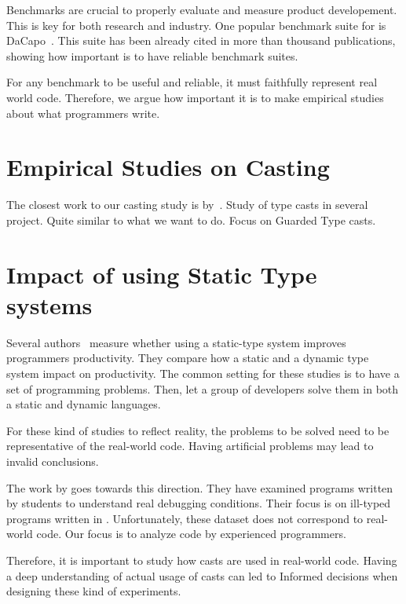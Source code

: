 Benchmarks are crucial to properly evaluate and measure product developement.
This is key for both research and industry.
One popular benchmark suite for \java{} is DaCapo~\cite{blackburn_dacapo_2006}.
This suite has been already cited in more than thousand publications, showing how important is to have reliable benchmark suites.

For any benchmark to be useful and reliable, it must faithfully represent real world code.
Therefore, we argue how important it is to make empirical studies about what programmers write.

\section{Empirical Studies on Casting}

The closest work to our casting study is by~\cite{winther_guarded_2011}.
Study of type casts in several project.
Quite similar to what we want to do.
Focus on Guarded Type casts.


\section{Impact of using Static Type systems}

Several authors~\cite{stuchlik_static_2011,mayer_empirical_2012,harlin_impact_2017} measure whether using a static-type system improves programmers productivity.
They compare how a static and a dynamic type system impact on productivity.
The common setting for these studies is to have a set of programming problems.
Then, let a group of developers solve them in both a static and dynamic languages.

For these kind of studies to reflect reality, the problems to be solved need to
be representative of the real-world code.
Having artificial problems may lead to invalid conclusions.

The work by \cite{wu_how_2017,wu_learning_2017} goes towards this direction.
They have examined programs written by students to understand real debugging conditions.
Their focus is on ill-typed programs written in \haskell{}.
Unfortunately, these dataset does not correspond to real-world code.
Our focus is to analyze code by experienced programmers.

Therefore, it is important to study how casts are used in real-world code.
Having a deep understanding of actual usage of casts can led to
Informed decisions when designing these kind of experiments.

